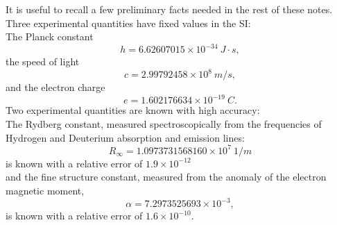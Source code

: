 \documentclass[12pt,a4paper]{article}
\def\hplanck{6.62607015\times 10^{-34}}
\def\cspeed{2.99792458\times 10^{8}}
\def\e{1.602176634\times 10^{-19}}
\def\rydberg{1.0973731568160\times 10^{7}}
\def\alphaf{7.2973525693\times 10^{-3}}
\begin{document}
It is useful to recall a few preliminary facts needed in the rest of 
these notes. \\
Three experimental quantities have fixed values in the SI: 
\\
The Planck constant 
\begin{equation}
h=\hplanck\ J\cdot s, 
\label{hplanck}
\end{equation}
the speed of light 
\begin{equation}
c=\cspeed\ m/s,
\label{cspeed}
\end{equation}
 and the electron charge
\begin{equation}
e=\e\ C. 
\label{echarge}
\end{equation}
Two experimental quantities are known with high accuracy:
\\
The Rydberg constant, measured spectroscopically from the frequencies of
Hydrogen and Deuterium absorption and emission lines:
\begin{equation}
R_\infty=
\rydberg\ 1/m
\label{rydberg}
\end{equation}
is known with a relative error of $1.9\times 10^{-12}$ \\
and the fine structure constant, measured from the anomaly of the
electron magnetic moment,
\begin{equation}
\alpha=
\alphaf,
\label{alpha}
\end{equation}
is known with a relative error of $1.6\times 10^{-10}$.
\end{document}
